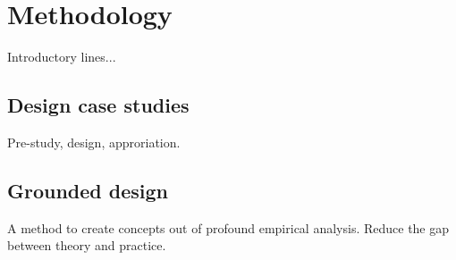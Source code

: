 \chapter{Methodology} 

Introductory lines...

\section{Design case studies}

Pre-study, design, approriation. 

\section{Grounded design}

A method to create concepts out of profound empirical analysis. 
Reduce the gap between theory and practice. 
